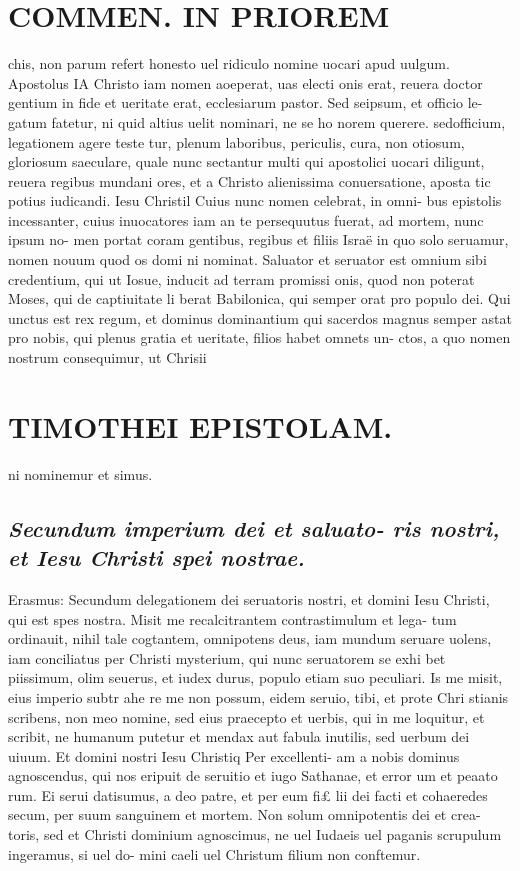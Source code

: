 \documentclass{article}
\begin{document}
\begin{pages}
\section*{COMMEN. IN PRIOREM }
\marginpar{[ p.4 ]}\pstart chis, non parum refert honesto uel ridiculo nomine uocari apud uulgum.  \pend\pstart Apostolus IA Christo iam nomen aoeperat, uas electi onis erat, reuera doctor gentium in fide et ueritate erat, ecclesiarum pastor. Sed seipsum, et officio le- gatum fatetur, ni quid altius uelit nominari, ne se ho norem querere. sedofficium, legationem agere teste tur, plenum laboribus, periculis, cura, non otiosum, gloriosum saeculare, quale nunc sectantur multi qui apostolici uocari diligunt, reuera regibus mundani ores, et a Christo alienissima conuersatione, aposta tic potius iudicandi.  \pend\pstart Iesu Christil Cuius nunc nomen celebrat, in omni- bus epistolis incessanter, cuius inuocatores iam an te persequutus fuerat, ad mortem, nunc ipsum no- men portat coram gentibus, regibus et filiis Israë in quo solo seruamur, nomen nouum quod os domi ni nominat. Saluator et seruator est omnium sibi credentium, qui ut Iosue, inducit ad terram promissi onis, quod non poterat Moses, qui de captiuitate li berat Babilonica, qui semper orat pro populo dei. Qui unctus est rex regum, et dominus dominantium qui sacerdos magnus semper astat pro nobis, qui plenus gratia et ueritate, filios habet omnets un- ctos, a quo nomen nostrum consequimur, ut Chrisii  \pend
\section*{TIMOTHEI EPISTOLAM. }
\marginpar{[ p.5 ]}\pstart ni nominemur et simus.  \pend
{}
{}
\subsection*{\textit{Secundum imperium dei et saluato- ris nostri, et Iesu Christi spei nostrae. }}\pstart Erasmus: Secundum delegationem dei seruatoris nostri, et domini Iesu Christi, qui est spes nostra. Misit me recalcitrantem contrastimulum et lega- tum ordinauit, nihil tale cogtantem, omnipotens deus, iam mundum seruare uolens, iam conciliatus per Christi mysterium, qui nunc seruatorem se exhi bet piissimum, olim seuerus, et iudex durus, populo etiam suo peculiari. Is me misit, eius imperio subtr ahe re me non possum, eidem seruio, tibi, et prote Chri stianis scribens, non meo nomine, sed eius praecepto et uerbis, qui in me loquitur, et scribit, ne humanum putetur et mendax aut fabula inutilis, sed uerbum dei uiuum.  \pend\pstart Et domini nostri Iesu Christiq Per excellenti- am a nobis dominus agnoscendus, qui nos eripuit de seruitio et iugo Sathanae, et error um et peaato rum. Ei serui datisumus, a deo patre, et per eum fi£ lii dei facti et cohaeredes secum, per suum sanguinem et mortem. Non solum omnipotentis dei et crea- toris, sed et Christi dominium agnoscimus, ne uel Iudaeis uel paganis scrupulum ingeramus, si uel do- mini caeli uel Christum filium non conftemur.  \pend

\end{pages}
\end{document}
